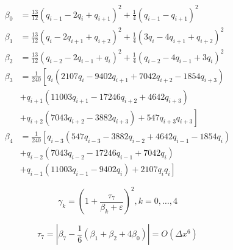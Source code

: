 \begin{equation}
\begin{aligned}
\beta_{0}&=\frac{13}{12}\left(q_{i-1}-2 q_{i}+q_{i+1}\right)^{2}+\frac{1}{4}\left(q_{i-1}-q_{i+1}\right)^{2}\\
\beta_{1}&=\frac{13}{12}\left(q_{i}-2 q_{i+1}+q_{i+2}\right)^{2}+\frac{1}{4}\left(3 q_{i}-4 q_{i+1}+q_{i+2}\right)^{2}\\
\beta_{2}&=\frac{13}{12}\left(q_{i-2}-2 q_{i-1}+q_{i}\right)^{2}+\frac{1}{4}\left(q_{i-2}-4 q_{i-1}+3 q_{i}\right)^{2}\\
\beta_{3} &=\frac{1}{240}\left[q_{i}\left(2107 q_{i}-9402 q_{i+1}+7042 q_{i+2}-1854 q_{i+3}\right)\right.\\
&+q_{i+1}\left(11003 q_{i+1}-17246 q_{i+2}+4642 q_{i+3}\right) \\
&\left.+q_{i+2}\left(7043 q_{i+2}-3882 q_{i+3}\right)+547 q_{i+3} q_{i+3}\right] \\
\beta_{4} &=\frac{1}{240}\left[q_{i-3}\left(547 q_{i-3}-3882 q_{i-2}+4642 q_{i-1}-1854 q_{i}\right)\right.\\
&+q_{i-2}\left(7043 q_{i-2}-17246 q_{i-1}+7042 q_{i}\right) \\
&\left.+q_{i-1}\left(11003 q_{i-1}-9402 q_{i}\right)+2107 q_{i} q_{i}\right]
\end{aligned}
\end{equation}

\begin{equation}
\gamma_{k}=\left(1+\frac{\tau_{7}}{\beta_{k}+\varepsilon}\right)^{2}, k=0, \ldots, 4
\end{equation}

\begin{equation}
\tau_{7}=\left|\beta_{7}-\frac{1}{6}\left(\beta_{1}+\beta_{2}+4 \beta_{0}\right)\right|=O\left(\Delta x^{6}\right)
\end{equation}

